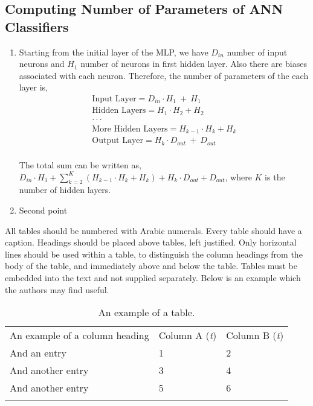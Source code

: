 \documentclass[3p,times,procedia]{elsarticle}
\begin{document}
\subsection{\textbf{Computing Number of Parameters of ANN Classifiers}}
\begin{enumerate}
    \item Starting from the initial layer of the MLP, we have $D_{in}$ number of input neurons and $H_1$ number of neurons in first hidden layer. Also there are biases associated with 
each neuron. Therefore, the number of parameters of the each layer is,
    \vspace{-0.75cm}
    \begin{equation*}
    \begin{array}{r}
    \textrm{Input Layer} = D_{in} \cdotp H_{1} \ +\ H_{1} \\
    \textrm{Hidden Layers}= H_1 \cdot H_2 + H_2\\
    \cdot \cdot \cdot \hspace{2em} \\
    \textrm{More Hidden Layers} = H_{k-1} \cdot H_k + H_k\\
    \textrm{Output Layer} = H_{k} \cdotp D_{out} \ +\ D_{out} \\
    \end{array}
    \end{equation*}

    The total sum can be written as, $D_{in}\cdot H_1 + \sum_{k=2}^{K} (H_{k-1} \cdot H_k + H_k) + H_k \cdot D_{out} +  D_{out}$, where $K$ is the number of hidden layers.
    \item Second point
\end{enumerate}

All tables should be numbered with Arabic numerals. Every table should have a caption. Headings should be placed above tables, left justified. Only horizontal lines should be used within a table, to distinguish the column headings from the body of the table, and immediately above and below the table. Tables must be embedded into the text and not supplied separately. Below is an example which the authors may find useful.

\begin{table}[h]
\caption{ An example of a table.}
\begin{tabular*}{\hsize}{@{\extracolsep{\fill}}lll@{}}
\toprule
An example of a column heading & Column A ({\it{t}}) & Column B ({\it{t}})\\
\colrule
And an entry &   1 &  2\\
And another entry  & 3 &  4\\
And another entry &  5 &  6\\
\botrule
\end{tabular*}
\end{table}
\end{document}
